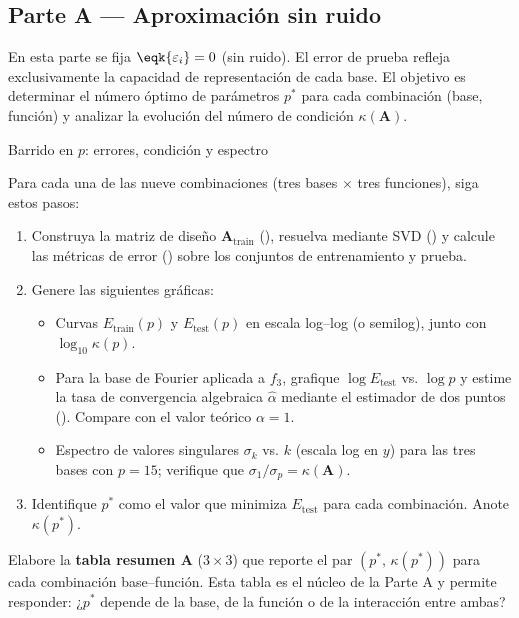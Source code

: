 \subsection*{Parte A — Aproximación sin ruido}
\label{sec:parteA}

En esta parte se fija \(\eqk{\varepsilon_i}=0\) (sin ruido). El error de prueba refleja exclusivamente la capacidad de representación de cada base. El objetivo es determinar el número óptimo de parámetros \(p^*\) para cada combinación (base, función) y analizar la evolución del número de condición \(\kappa(\mathbf{A})\).

\begin{ejerciciocomp}{Barrido en \(p\): errores, condición y espectro}
\label{ej:barrido_sinruido}

Para cada una de las nueve combinaciones (tres bases \(\times\) tres funciones), siga estos pasos:

\begin{enumerate}[leftmargin=2em, label=\alph*)]
  \item Construya la matriz de diseño \(\mathbf{A}_{\mathrm{train}}\) (), resuelva mediante SVD () y calcule las métricas de error () sobre los conjuntos de entrenamiento y prueba. 
  \item Genere las siguientes gráficas:
    \begin{itemize}[nosep, leftmargin=1.5em]
      \item Curvas \(E_{\mathrm{train}}(p)\) y \(E_{\mathrm{test}}(p)\) en escala log–log (o semilog), junto con \(\log_{10}\kappa(p)\).
      \item Para la base de Fourier aplicada a \(f_3\), grafique \(\log E_{\mathrm{test}}\) vs. \(\log p\) y estime la tasa de convergencia algebraica \(\hat{\alpha}\) mediante el estimador de dos puntos (). Compare con el valor teórico \(\alpha = 1\).
      \item Espectro de valores singulares \(\sigma_k\) vs. \(k\) (escala log en \(y\)) para las tres bases con \(p = 15\); verifique que \(\sigma_1/\sigma_p = \kappa(\mathbf{A})\).
    \end{itemize}
  \item Identifique \(p^*\) como el valor que minimiza \(E_{\mathrm{test}}\) para cada combinación. Anote \(\kappa(p^*)\).
\end{enumerate}

Elabore la \textbf{tabla resumen A} (\(3\times 3\)) que reporte el par \((p^*,\, \kappa(p^*))\) para cada combinación base–función. Esta tabla es el núcleo de la Parte A y permite responder: ¿\(p^*\) depende de la base, de la función o de la interacción entre ambas?

\end{ejerciciocomp}

